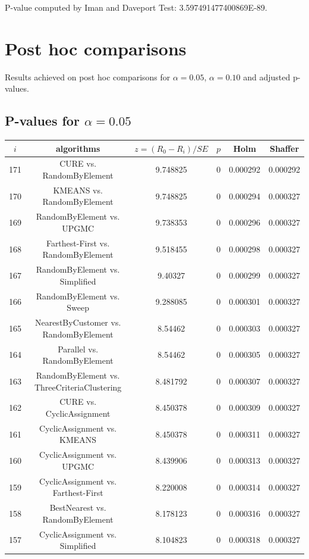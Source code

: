 \documentclass[a4paper,10pt]{article}
\begin{document}
\begin{landscape}
P-value computed by Iman and Daveport Test: 3.597491477400869E-89.\newline



\pagebreak

\section{Post hoc comparisons}

Results achieved on post hoc comparisons for $\alpha = 0.05$, $\alpha = 0.10$ and adjusted p-values.

\subsection{P-values for $\alpha=0.05$}

\begin{table}[!htp]
\centering\scriptsize
\begin{tabular}{cccccc}
$i$&algorithms&$z=(R_0 - R_i)/SE$&$p$&Holm&Shaffer\\
\hline171&CURE vs. RandomByElement&9.748825&0&0.000292&0.000292\\
170&KMEANS vs. RandomByElement&9.748825&0&0.000294&0.000327\\
169&RandomByElement vs. UPGMC&9.738353&0&0.000296&0.000327\\
168&Farthest-First vs. RandomByElement&9.518455&0&0.000298&0.000327\\
167&RandomByElement vs. Simplified&9.40327&0&0.000299&0.000327\\
166&RandomByElement vs. Sweep&9.288085&0&0.000301&0.000327\\
165&NearestByCustomer vs. RandomByElement&8.54462&0&0.000303&0.000327\\
164&Parallel vs. RandomByElement&8.54462&0&0.000305&0.000327\\
163&RandomByElement vs. ThreeCriteriaClustering&8.481792&0&0.000307&0.000327\\
162&CURE vs. CyclicAssignment&8.450378&0&0.000309&0.000327\\
161&CyclicAssignment vs. KMEANS&8.450378&0&0.000311&0.000327\\
160&CyclicAssignment vs. UPGMC&8.439906&0&0.000313&0.000327\\
159&CyclicAssignment vs. Farthest-First&8.220008&0&0.000314&0.000327\\
158&BestNearest vs. RandomByElement&8.178123&0&0.000316&0.000327\\
157&CyclicAssignment vs. Simplified&8.104823&0&0.000318&0.000327\\

\end{tabular}
\end{table}
\end{landscape}
\end{document}
